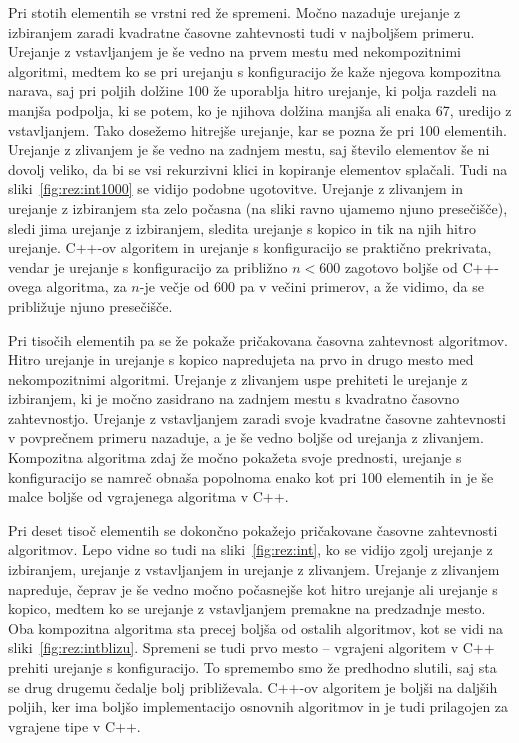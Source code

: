\documentclass[a4paper,oneside,12pt]{article}
\begin{document}
Pri stotih elementih se vrstni red že spremeni. Močno nazaduje urejanje z izbiranjem zaradi 
kvadratne časovne zahtevnosti tudi v najboljšem primeru. Urejanje z vstavljanjem je še vedno 
na prvem mestu med nekompozitnimi algoritmi, medtem ko se pri urejanju s konfiguracijo že kaže njegova
kompozitna narava, saj pri poljih dolžine 100 že uporablja hitro urejanje, ki polja razdeli na 
manjša podpolja, ki se potem, ko je njihova dolžina manjša ali enaka 67, uredijo z vstavljanjem.
Tako dosežemo hitrejše urejanje, kar se pozna že pri 100 elementih. Urejanje z zlivanjem je še 
vedno na zadnjem mestu, saj število elementov še ni dovolj veliko, da bi se vsi rekurzivni klici 
in kopiranje elementov splačali. Tudi na sliki~\ref{fig:rez:int1000} se vidijo
podobne ugotovitve. Urejanje z zlivanjem in urejanje z izbiranjem sta zelo
počasna (na sliki ravno ujamemo njuno presečišče), 
sledi jima urejanje z izbiranjem, sledita urejanje s kopico in tik na
njih hitro urejanje.  C++-ov algoritem in urejanje s konfiguracijo se praktično
prekrivata, vendar je urejanje s konfiguracijo za približno $n < 600$ zagotovo
boljše od C++-ovega algoritma, za $n$-je večje od 600 pa v večini primerov, a že
vidimo, da se približuje njuno presečišče.

Pri tisočih elementih pa se že pokaže pričakovana časovna zahtevnost algoritmov. Hitro urejanje in urejanje
s kopico napredujeta na prvo in drugo mesto med nekompozitnimi algoritmi. Urejanje z zlivanjem uspe 
prehiteti le urejanje z izbiranjem, ki je močno zasidrano na zadnjem mestu s kvadratno časovno 
zahtevnostjo. Urejanje z vstavljanjem zaradi svoje kvadratne časovne zahtevnosti v povprečnem 
primeru nazaduje, a je še vedno boljše od urejanja z zlivanjem.
Kompozitna algoritma zdaj že močno pokažeta svoje prednosti, urejanje s konfiguracijo se namreč 
obnaša popolnoma enako kot pri 100 elementih in je še malce boljše od vgrajenega
algoritma v C++.

Pri deset tisoč elementih se dokončno pokažejo pričakovane časovne zahtevnosti
algoritmov. Lepo vidne so tudi na sliki~\ref{fig:rez:int}, ko se vidijo zgolj
urejanje z izbiranjem, urejanje z vstavljanjem in urejanje z zlivanjem.
Urejanje z zlivanjem napreduje, čeprav je še vedno močno počasnejše kot hitro urejanje ali
urejanje s kopico, medtem ko se urejanje z vstavljanjem premakne na predzadnje 
mesto. Oba kompozitna algoritma sta precej boljša od ostalih algoritmov, kot se
vidi na sliki~\ref{fig:rez:intblizu}. Spremeni se tudi prvo mesto -- vgrajeni algoritem v C++
prehiti urejanje s konfiguracijo. To spremembo smo že predhodno slutili, saj sta
se drug drugemu čedalje bolj približevala. C++-ov algoritem je boljši na daljših
poljih, ker ima boljšo implementacijo osnovnih algoritmov in je tudi
prilagojen za vgrajene tipe v C++. 
\end{document}
